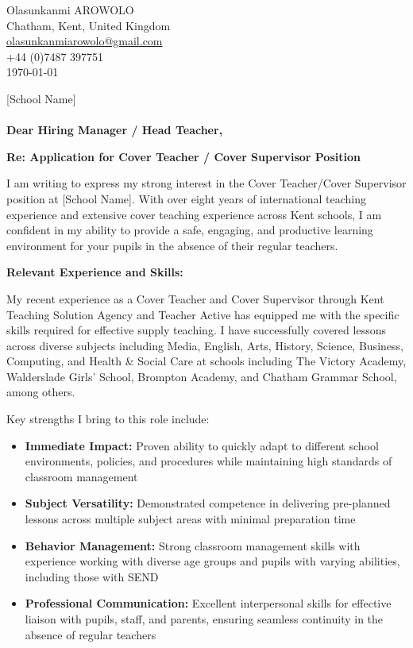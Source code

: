 \documentclass[11pt,a4paper]{article}
\begin{document}
\begin{flushright}
Olasunkanmi AROWOLO \\
Chatham, Kent, United Kingdom \\
\href{mailto:olasunkanmiarowolo@gmail.com}{olasunkanmiarowolo@gmail.com} \\
+44 (0)7487 397751 \\
\today
\end{flushright}

\vspace{1cm}

[School Name] \\
[School Address] \\
[City, Postal Code]

\textbf{Dear Hiring Manager / Head Teacher,}

\textbf{Re: Application for Cover Teacher / Cover Supervisor Position}

I am writing to express my strong interest in the Cover Teacher/Cover Supervisor position at [School Name]. With over eight years of international teaching experience and extensive cover teaching experience across Kent schools, I am confident in my ability to provide a safe, engaging, and productive learning environment for your pupils in the absence of their regular teachers.

\textbf{Relevant Experience and Skills:}

My recent experience as a Cover Teacher and Cover Supervisor through Kent Teaching Solution Agency and Teacher Active has equipped me with the specific skills required for effective supply teaching. I have successfully covered lessons across diverse subjects including Media, English, Arts, History, Science, Business, Computing, and Health \& Social Care at schools including The Victory Academy, Walderslade Girls' School, Brompton Academy, and Chatham Grammar School, among others.

Key strengths I bring to this role include:

\begin{itemize}
\item \textbf{Immediate Impact:} Proven ability to quickly adapt to different school environments, policies, and procedures while maintaining high standards of classroom management
\item \textbf{Subject Versatility:} Demonstrated competence in delivering pre-planned lessons across multiple subject areas with minimal preparation time
\item \textbf{Behavior Management:} Strong classroom management skills with experience working with diverse age groups and pupils with varying abilities, including those with SEND
\item \textbf{Professional Communication:} Excellent interpersonal skills for effective liaison with pupils, staff, and parents, ensuring seamless continuity in the absence of regular teachers
\end{itemize}
\end{document}
